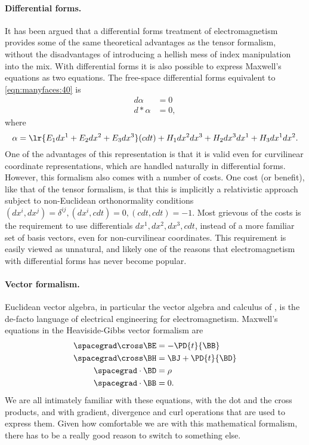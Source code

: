 \paragraph{Differential forms.}
It has been argued that a differential forms treatment of
electromagnetism provides some of the same theoretical advantages as the tensor formalism, without the disadvantages
of introducing a hellish mess of index manipulation into the mix.
With differential forms it is also possible to express Maxwell's equations as two equations.
The free-space differential forms equivalent
\citep{flanders1989dfa}
to \cref{eqn:manyfaces:40} is
\begin{dmath}\label{eqn:manyfaces:60}
\begin{aligned}
d \alpha &= 0 \\
d *\alpha &= 0,
\end{aligned}
\end{dmath}
where
\begin{dmath}\label{eqn:manyfaces:180}
\alpha = \lr{ E_1 dx^1 + E_2 dx^2 + E_3 dx^3 }(c dt) + H_1 dx^2 dx^3 + H_2 dx^3 dx^1 + H_3 dx^1 dx^2.
\end{dmath}
One of the advantages of this representation is that it is valid even for curvilinear coordinate representations, which are handled naturally in differential forms.
However, this formalism also comes with a number of costs.
One cost (or benefit), like that of the tensor formalism, is that this is implicitly a relativistic
approach subject to non-Euclidean orthonormality conditions \( (dx^i, dx^j) = \delta^{ij}, (dx^i, c dt) = 0, (c dt, c dt) = -1 \).
Most grievous of the costs is the requirement to use differentials \( dx^1, dx^2, dx^3, c dt \), instead of a more familiar set of basis vectors, even for non-curvilinear coordinates.
This requirement is easily viewed as unnatural, and likely one of the reasons that electromagnetism with differential forms has never become popular.

\paragraph{Vector formalism.}
Euclidean vector algebra, in particular the vector algebra and calculus of ,
is the de-facto language of electrical engineering for electromagnetism.
Maxwell's equations in the Heaviside-Gibbs vector formalism are
\begin{dmath}\label{eqn:manyfaces:20}
\begin{aligned}
\spacegrad \cross \BE &= - \PD{t}{\BB} \\
\spacegrad \cross \BH &= \BJ + \PD{t}{\BD} \\
\spacegrad \cdot \BD &= \rho \\
\spacegrad \cdot \BB &= 0.
\end{aligned}
\end{dmath}
We are all intimately familiar with these equations, with the dot and the cross products, and with gradient, divergence and curl operations that are used to express them.
Given how comfortable we are with this mathematical formalism, there has to be a really good reason to switch to something else.

